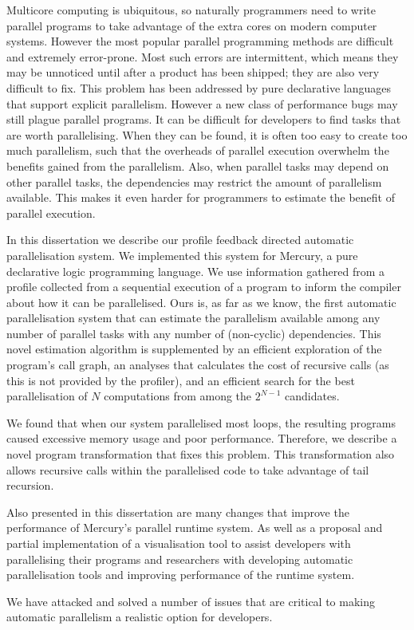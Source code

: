 
Multicore computing is ubiquitous,
so naturally programmers need to write
parallel programs to take advantage of the extra cores on modern computer
systems.
However the most popular parallel programming methods are difficult and
extremely error-prone.
Most such errors are intermittent,
which means they may be unnoticed until after a product has been shipped;
they are also very difficult to fix.
This problem has been addressed by pure declarative languages that support
explicit parallelism.
However a new class of performance bugs may still plague parallel
programs.
It can be difficult for developers to find tasks that are worth
parallelising.
When they can be found,
it is often too easy to create too much parallelism,
such that the overheads of parallel execution overwhelm the benefits gained
from the parallelism.
Also, when parallel tasks may depend on other parallel tasks,
the dependencies may restrict the amount of parallelism available.
This makes it even harder for programmers to estimate the benefit of
parallel execution.

In this dissertation we describe our 
profile feedback directed automatic parallelisation system.
We implemented this system for Mercury, a pure declarative logic programming
language.
We use information gathered from a profile collected from a sequential
execution of a program to inform the compiler about how it can be
parallelised.
Ours is, as far as we know, the first automatic parallelisation system that
can estimate the parallelism available among any number of parallel tasks
with any number of (non-cyclic) dependencies.
This novel estimation algorithm is supplemented by
an efficient exploration of the program's call graph,
an analyses that calculates the cost of recursive calls (as this is not provided
by the profiler),
and an efficient search for the best parallelisation of $N$ computations 
from among the $2^{N-1}$ candidates.

We found that when our system parallelised most loops,
the resulting programs caused excessive memory usage and poor performance.
Therefore,
we describe a novel program transformation that fixes this problem.
This transformation also allows recursive calls within the parallelised code
to take advantage of tail recursion.

Also presented in this dissertation are many changes that improve the
performance of Mercury's parallel runtime system.
As well as a proposal and partial implementation of a visualisation tool to
assist developers with parallelising their programs
and researchers with developing automatic parallelisation tools and
improving performance of the runtime system.

We have attacked and solved a number of issues that are critical to
making automatic parallelism a realistic option for developers.


